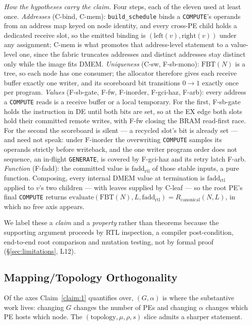 \documentclass[journal,10pt]{IEEEtran}
\theoremstyle{plain}
\theoremstyle{definition}
\theoremstyle{remark}
\newcommand{\FBT}{\ensuremath{\mathrm{FBT}}}
\newcommand{\fadd}{\ensuremath{\mathrm{fadd}_{\mathrm{rtl}}}}
\newcommand{\Rcan}{\ensuremath{R_{\mathrm{canonical}}}}
\newcommand{\sv}[1]{\texttt{#1}}
\newcommand{\asgn}{\ensuremath{\alpha}}
\newcommand{\map}{\ensuremath{\mu}}
\begin{document}
\emph{How the hypotheses carry the claim.} Four steps, each of the eleven
used at least once. \emph{Addresses} (\textsf{C-bind}, \textsf{C-mem}):
\sv{build\_schedule} binds a \texttt{COMPUTE}'s operands from an address map
keyed on node identity, and every cross-PE child holds a dedicated receive
slot, so the emitted binding is $(\mathrm{left}(v),\mathrm{right}(v))$ under
any assignment; \textsf{C-mem} is what promotes that address-level statement
to a value-level one, since the fabric truncates addresses and distinct
addresses stay distinct only while the image fits DMEM. \emph{Uniqueness}
(\textsf{C-sw}, \textsf{F-sb-mono}): $\FBT(N)$ is a tree, so each node has one
consumer; the allocator therefore gives each receive buffer exactly one
writer, and its scoreboard bit transitions $0\to1$ exactly once per program.
\emph{Values} (\textsf{F-sb-gate}, \textsf{F-fw}, \textsf{F-inorder},
\textsf{F-gci-haz}, \textsf{F-arb}): every address a \texttt{COMPUTE} reads is
a receive buffer or a local temporary. For the first, \textsf{F-sb-gate} holds
the instruction in \textsf{DE} until both bits are set, so at the EX edge both
slots hold their committed remote writes, with \textsf{F-fw} closing the
BRAM read-first race. For the second the scoreboard is silent --- a recycled
slot's bit is already set --- and need not speak: under \textsf{F-inorder} the
overwriting \texttt{COMPUTE} samples its operands strictly before writeback,
and the one writer program order does not sequence, an in-flight
\texttt{GENERATE}, is covered by \textsf{F-gci-haz} and its retry latch
\textsf{F-arb}. \emph{Function} (\textsf{F-fadd}): the committed value is
$\fadd$ of those stable inputs, a pure function. Composing, every internal
DMEM value at termination is $\fadd$ applied to $v$'s two children --- with
leaves supplied by \textsf{C-leaf} --- so the root PE's final \texttt{COMPUTE}
returns $\mathrm{evaluate}(\FBT(N), L, \fadd) = \Rcan(N,L)$, in which no free
axis appears.

We label these a \emph{claim} and a \emph{property} rather than theorems
because the supporting argument proceeds by RTL inspection, a compiler
post-condition, end-to-end root comparison and mutation testing, not by formal
proof (\S\ref{sec:limitations}, L12).

\subsection{Mapping/Topology Orthogonality}\label{sec:abi-orth}

Of the axes Claim~\ref{claim:1} quantifies over, $(G,\asgn)$ is where the
substantive work lives: changing $G$ changes the number of PEs and changing
$\asgn$ changes which PE hosts which node. The $(\text{topology},\map,\rho,s)$
slice admits a sharper statement.
\end{document}
